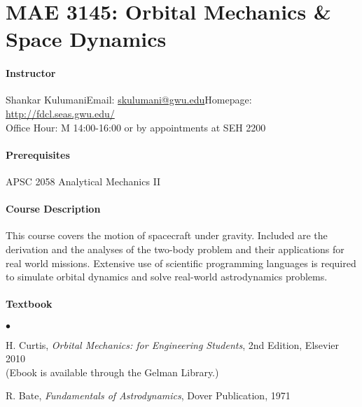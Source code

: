 \documentclass[10pt]{article}
\date{}
\begin{document}
\pagestyle{empty}
\section*{MAE 3145: Orbital Mechanics \& Space Dynamics}
\vspace*{-0.4cm}


\paragraph*{Instructor}
Shankar Kulumani\quad Email: \href{mailto:skulumani@gwu.edu}{skulumani@gwu.edu}\quad Homepage: \url{http://fdcl.seas.gwu.edu/}\\
\hspace*{1.8cm}
Office Hour: M 14:00-16:00 or by appointments at SEH 2200


\paragraph*{Prerequisites} APSC 2058 Analytical Mechanics II

\paragraph*{Course Description} This course covers the motion of spacecraft under gravity. Included are the derivation and the analyses of the two-body problem and their applications for real world missions.
Extensive use of scientific programming languages is required to simulate orbital dynamics and solve real-world astrodynamics problems.

\paragraph*{Textbook}
\begin{list}{$\bullet$}{\setlength{\itemsep}{-3pt}}\item 
H. Curtis, \textit{Orbital Mechanics: for Engineering Students}, 2nd Edition, Elsevier 2010\\
(Ebook is available through the Gelman Library.)
\item R. Bate, \textit{Fundamentals of Astrodynamics}, Dover Publication, 1971
\end{list}
\end{document}
